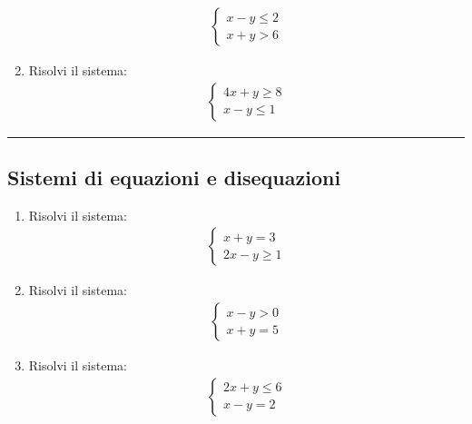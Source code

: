 \documentclass[letterpaper,10pt,italian]{jupyterBook}
\begin{document}
\begin{enumerate}
\begin{equation*}
\begin{split}
\begin{cases}
    x - y \leq 2 \\
    x + y > 6
    \end{cases}
    \end{split}
\end{equation*}
\item {} 
\sphinxAtStartPar
Risolvi il sistema:
\begin{equation*}
\begin{split}
    \begin{cases}
    4x + y \geq 8 \\
    x - y \leq 1
    \end{cases}
    \end{split}
\end{equation*}
\end{enumerate}


\bigskip\hrule\bigskip



\subsection{Sistemi di equazioni e disequazioni}
\label{\detokenize{ch/algebra/real-n-algebra:sistemi-di-equazioni-e-disequazioni}}\begin{enumerate}
%
\item {} 
\sphinxAtStartPar
Risolvi il sistema:
\begin{equation*}
\begin{split}
    \begin{cases}
    x + y = 3 \\
    2x - y \geq 1
    \end{cases}
    \end{split}
\end{equation*}
\item {} 
\sphinxAtStartPar
Risolvi il sistema:
\begin{equation*}
\begin{split}
    \begin{cases}
    x - y > 0 \\
    x + y = 5
    \end{cases}
    \end{split}
\end{equation*}
\item {} 
\sphinxAtStartPar
Risolvi il sistema:
\begin{equation*}
\begin{split}
    \begin{cases}
    2x + y \leq 6 \\
    x - y = 2
    \end{cases}
    \end{split}
\end{equation*}
\end{enumerate}
\end{document}
